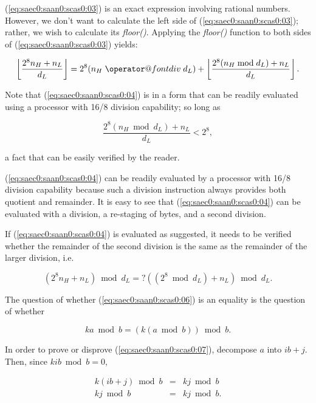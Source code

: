 \documentclass[letterpaper,10pt,titlepage]{article}
\makeatletter
\def\bdiv{%
  \nonscript\mskip-\medmuskip\mkern5mu%
  \mathbin{\operator@font div}\penalty900\mkern5mu%
  \nonscript\mskip-\medmuskip}
\makeatother
\begin{document}
(\ref{eq:saec0:saan0:scas0:03}) is an exact expression involving rational numbers.
However, we don't want to calculate the left side of (\ref{eq:saec0:saan0:scas0:03});
rather, we wish to calculate its \emph{floor()}\@.  Applying the
\emph{floor()} function to both sides of (\ref{eq:saec0:saan0:scas0:03}) yields:

\begin{equation}
\label{eq:saec0:saan0:scas0:04}
\left\lfloor \frac{2^8 n_H + n_L}{d_L} \right\rfloor
=
2^8 (n_H \bdiv d_L) + \left\lfloor \frac{2^8 (n_H \bmod d_L) + n_L}{d_L} \right\rfloor .
\end{equation}

Note that (\ref{eq:saec0:saan0:scas0:04}) is in a form
that can be readily evaluated using a processor with 16/8 division 
capability; so long as 

\begin{equation}
\label{eq:saec0:saan0:scas0:05}
\frac{2^8 (n_H \bmod d_L) + n_L}{d_L} < 2^8 ,
\end{equation}

\noindent{}a fact that can be easily verified by the reader.

(\ref{eq:saec0:saan0:scas0:04}) can be readily evaluated by a processor with 
16/8 division capability because such a division instruction always provides
both quotient and remainder.  It is easy to see that (\ref{eq:saec0:saan0:scas0:04})
can be evaluated with a division, a re-staging of bytes, and a second division.

If (\ref{eq:saec0:saan0:scas0:04}) is evaluated as suggested, it needs to be verified
whether the remainder of the second division is the same as the remainder
of the larger division, i.e.

\begin{equation}
\label{eq:saec0:saan0:scas0:06}
(2^8 n_H + n_L) \bmod d_L =? ((2^8 \bmod d_L) + n_L) \bmod d_L.
\end{equation}

The question of whether (\ref{eq:saec0:saan0:scas0:06}) is an
equality is the question of whether

\begin{equation}
\label{eq:saec0:saan0:scas0:07}
ka \bmod b = (k (a \bmod b)) \bmod b .
\end{equation}

In order to prove or disprove (\ref{eq:saec0:saan0:scas0:07}),
decompose $a$ into $ib + j$.  Then, since $kib \bmod b = 0$,

\begin{eqnarray}
\label{eq:saec0:saan0:scas0:08}
k (ib + j) \bmod b & = & k j \bmod b \\
\label{eq:saec0:saan0:scas0:09}
k j \bmod b & = & k j \bmod b .
\end{eqnarray}
\end{document}
